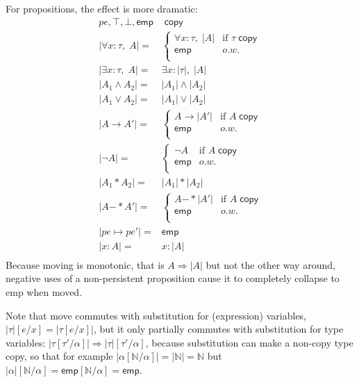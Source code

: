 \documentclass[acmsmall,nonacm]{acmart}
\newcommand*{\N}{\mathbb{N}}
\newcommand{\wand}{\mathrel{-\!\!\ast}}
\newcommand{\core}[1]{\left| #1 \right|}
\begin{document}
For propositions, the effect is more dramatic:
\begin{align*}
  pe,\top,\bot,\mathsf{emp}&\;\mathsf{copy}\\
  \core{\forall x:\tau,\;A}={}& \begin{cases}
    \forall x:\tau,\;\core A&\mbox{if $\tau\;\mathsf{copy}$}\\
    \mathsf{emp}&o.w.\\
  \end{cases}\\
  \core{\exists x:\tau,\;A}={}&\exists x:\core\tau,\;\core A\\
  \core{A_1\land A_2}={}&\core{A_1}\land \core{A_2}\\
  \core{A_1\lor A_2}={}&\core{A_1}\lor \core{A_2}\\
  \core{A\to A'}={}& \begin{cases}
    A\to \core{A'}&\mbox{if $A\;\mathsf{copy}$}\\
    \mathsf{emp}&o.w.\\
  \end{cases}\\
  \core{\neg A}={}& \begin{cases}
    \neg A&\mbox{if $A\;\mathsf{copy}$}\\
    \mathsf{emp}&o.w.\\
  \end{cases}\\
  \core{A_1\ast A_2}={}&\core{A_1}\ast \core{A_2}\\
  \core{A\wand A'}={}& \begin{cases}
    A\wand \core{A'}&\mbox{if $A\;\mathsf{copy}$}\\
    \mathsf{emp}&o.w.\\
  \end{cases}\\
  \core{pe\mapsto pe'}={}&\mathsf{emp}\\
  \core{\boxed{x:A}}={}&\boxed{x:\core{A}}\\
\end{align*}
Because moving is monotonic, that is $A\Rightarrow \core A$ but not the other way around, negative uses of a non-persistent proposition cause it to completely collapse to \textsf{emp} when moved.

Note that move commutes with substitution for (expression) variables, $\core{\tau}[e/x]=\core{\tau[e/x]}$, but it only partially commutes with substitution for type variables: $\core{\tau[\tau'/\alpha]}\Rightarrow\core{\tau}[\tau'/\alpha]$, because substitution can make a non-copy type copy, so that for example $\core{\alpha[\N/\alpha]}=\core{\N}=\N$ but $\core{\alpha}[\N/\alpha]=\mathsf{emp}[\N/\alpha]=\mathsf{emp}$.
\end{document}
